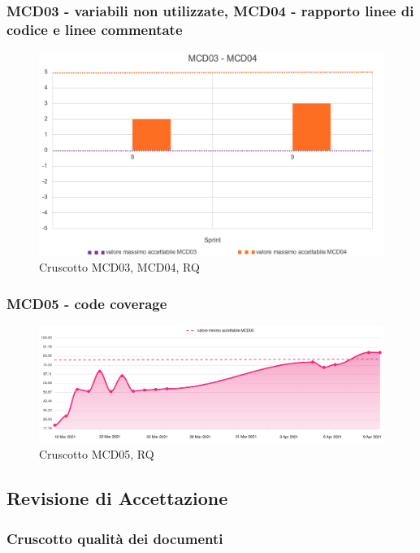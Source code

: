 \subsubsection*{MCD03 - variabili non utilizzate, MCD04 - rapporto linee di codice e linee commentate}
\begin{figure}[H] 
    \centering
    \includegraphics[scale = 0.6]{immagini/MCD03-04.png}
    \caption{Cruscotto MCD03, MCD04, RQ}
\end{figure}

\subsubsection*{MCD05 - code coverage}
\begin{figure}[H] 
    \centering
    \includegraphics[scale = 0.4]{immagini/MCD05.png}
    \caption{Cruscotto MCD05, RQ}
\end{figure}

\subsection{Revisione di Accettazione}
\subsubsection{Cruscotto qualità dei documenti}

